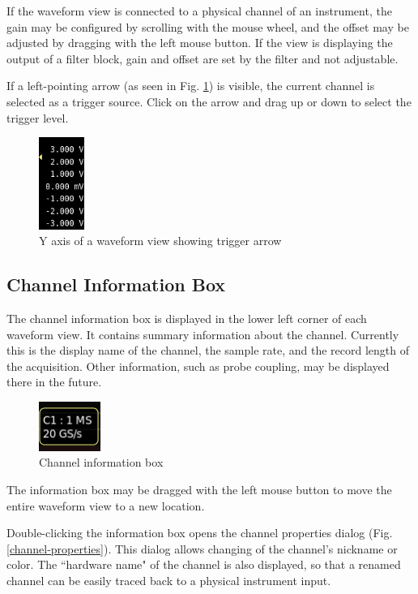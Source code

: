If the waveform view is connected to a physical channel of an instrument, the gain may be configured by scrolling with
the mouse wheel, and the offset may be adjusted by dragging with the left mouse button. If the view is displaying the
output of a filter block, gain and offset are set by the filter and not adjustable.

If a left-pointing arrow (as seen in Fig. \ref{y-axis}) is visible, the current channel is selected as a trigger
source. Click on the arrow and drag up or down to select the trigger level.

\begin{figure}[H]
\centering
\includegraphics[height=3cm]{images/y-axis.png}
\caption{Y axis of a waveform view showing trigger arrow}
\label{y-axis}
\end{figure}

\subsection{Channel Information Box}

The channel information box is displayed in the lower left corner of each waveform view. It contains summary
information about the channel. Currently this is the display name of the channel, the sample rate, and the record
length of the acquisition. Other information, such as probe coupling, may be displayed there in the future.

\begin{figure}[H]
\centering
\includegraphics[width=2cm]{images/channel-infobox.png}
\caption{Channel information box}
\label{channel-infobox}
\end{figure}

The information box may be dragged with the left mouse button to move the entire waveform view to a new location.

Double-clicking the information box opens the channel properties dialog (Fig. \ref{channel-properties}). This dialog
allows changing of the channel's nickname or color. The ``hardware name" of the channel is also displayed, so that a
renamed channel can be easily traced back to a physical instrument input.

